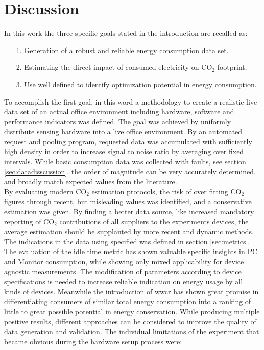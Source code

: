 \chapter{Discussion}\label{chap:discussion}
In this work the three specific goals stated in the introduction are recalled as:
\begin{itemize}
	\item[1.] Generation of a robust and reliable energy consumption data set.
	\item[2.] Estimating the direct impact of consumed electricity on CO$_2$ footprint.
	\item[3.] Use well defined  to identify optimization potential in energy consumption.
\end{itemize}
To accomplish the first goal, in this word a methodology to create a realistic live data set of an actual office environment including hardware, software and performance indicators was defined. The goal was achieved by uniformly distribute sensing hardware into a live office environment. By an automated request and pooling program, requested data was accumulated with sufficiently high density in order to increase signal to noise ratio by averaging over fixed intervals. While basic consumption data was collected with faults, see section \ref{sec:datadisscussion}, the order of magnitude can be very accurately determined, and broadly match expected values from the literature.\\
By evaluating modern CO$_2$ estimation protocols, the risk of over fitting CO$_2$ figures through recent, but misleading values was identified, and a conservative estimation was given. By finding a better data source, like increased mandatory reporting of CO$_2$ contributions of all suppliers to the experiments devices, the average estimation should be supplanted by more recent and dynamic methods.\\
The indications in the data using specified  was defined in section \ref{sec:metrics}. The evaluation of the idle time metric has shown valuable specific insights in PC and Monitor consumption, while showing only mixed applicability for device agnostic measurements. The modification of parameters according to device specifications is needed to increase reliable indication on energy usage by all kinds of devices. Meanwhile the introduction of \acrfull{wwcr} has shown great promise in differentiating consumers of similar total energy consumption into a ranking of little to great possible potential in energy conservation. While producing multiple positive results, different approaches can be considered to improve the quality of data generation and validation. The individual limitations of the experiment that became obvious during the hardware setup process were:

